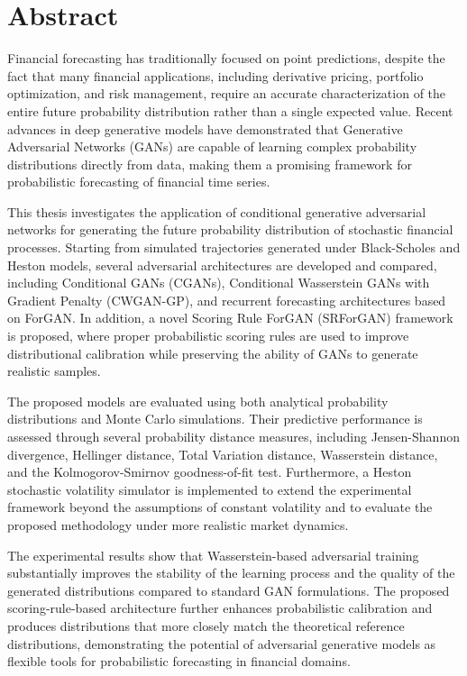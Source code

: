\chapter*{Abstract}

Financial forecasting has traditionally focused on point predictions, despite the fact that many financial applications, including derivative pricing, portfolio optimization, and risk management, require an accurate characterization of the entire future probability distribution rather than a single expected value. Recent advances in deep generative models have demonstrated that Generative Adversarial Networks (GANs) are capable of learning complex probability distributions directly from data, making them a promising framework for probabilistic forecasting of financial time series.

This thesis investigates the application of conditional generative adversarial networks for generating
the future probability distribution of stochastic financial processes. Starting from simulated trajectories generated under Black-Scholes and Heston models, 
several adversarial architectures are developed and compared,
including Conditional GANs (CGANs), Conditional Wasserstein GANs with Gradient Penalty (CWGAN-GP), and recurrent forecasting architectures based on ForGAN.
In addition, a novel Scoring Rule ForGAN (SRForGAN) framework is proposed, where proper probabilistic scoring rules are used to improve distributional calibration while preserving the ability of GANs to generate realistic samples.

The proposed models are evaluated using both analytical probability distributions and Monte Carlo simulations.
Their predictive performance is assessed through several probability distance measures, including Jensen-Shannon divergence, Hellinger distance, Total Variation distance, Wasserstein distance, and the Kolmogorov-Smirnov goodness-of-fit test.
Furthermore, a Heston stochastic volatility simulator is implemented to extend the experimental framework beyond the assumptions of constant volatility and to evaluate the proposed methodology under more realistic market dynamics.

The experimental results show that Wasserstein-based adversarial training substantially improves the stability of the learning process and the quality of the generated distributions compared to standard GAN formulations.
The proposed scoring-rule-based architecture further enhances probabilistic calibration and produces distributions that more closely match the theoretical reference distributions, 
demonstrating the potential of adversarial generative models as flexible tools for probabilistic forecasting in financial domains.